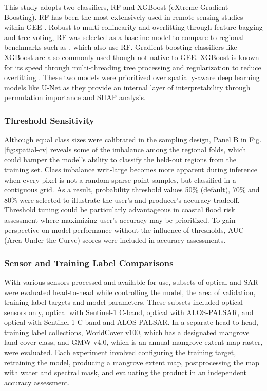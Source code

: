 \documentclass[final-report]{report-template}
\begin{document}
This study adopts two classifiers, RF and XGBoost (eXtreme Gradient Boosting). RF has been the most extensively used in remote sensing studies within GEE \parencite{Islam2025}. Robust to multi-collinearity and overfitting through feature bagging and tree voting, RF was selected as a baseline model to compare to regional benchmarks such as \textcite{Chan2024}, which also use RF. Gradient boosting classifiers like XGBoost are also commonly used though not native to GEE. XGBoost is known for its speed through multi-threading tree processing and regularization to reduce overfitting \parencite{Chen2016}. These two models were prioritized over spatially-aware deep learning models like U-Net as they provide an internal layer of interpretability through permutation importance and SHAP analysis. 

\subsubsection{Threshold Sensitivity}
Although equal class sizes were calibrated in the sampling design, Panel B in Fig.\ref{fig:spatial-cv} reveals some of the imbalance among the regional folds, which could hamper the model's ability to classify the held-out regions from the training set. Class imbalance writ-large becomes more apparent during inference when every pixel is not a random sparse point samples, but classified in a contiguous grid. As a result, probability threshold values 50\% (default), 70\% and 80\% were selected to illustrate the user's and producer's accuracy tradeoff. Threshold tuning could be particularly advantageous in coastal flood risk assessment where maximizing user's accuracy may be prioritized. To gain perspective on model performance without the influence of thresholds, AUC (Area Under the Curve) scores were included in accuracy assessments. 

\subsubsection{Sensor and Training Label Comparisons}
With various sensors processed and available for use, subsets of optical and SAR were evaluated head-to-head while controlling the model, the area of validation, training label targets and model parameters. These subsets included optical sensors only, optical with Sentinel-1 C-band, optical with ALOS-PALSAR, and optical with Sentinel-1 C-band and ALOS-PALSAR. In a separate head-to-head, training label collections, WorldCover v100, which has a designated mangrove land cover class, and GMW v4.0, which is an annual mangrove extent map raster, were evaluated. Each experiment involved configuring the training target, retraining the model, producing a mangrove extent map, postprocessing the map with water and spectral mask, and evaluating the product in an independent accuracy assessment. 
\end{document}
